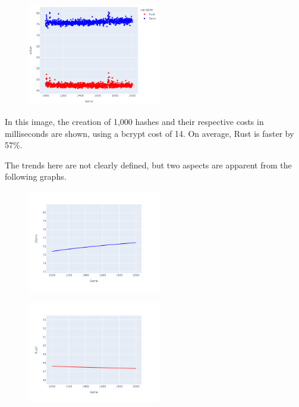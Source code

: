 \documentclass[12pt, letterpaper]{article}
\begin{document}
\begin{multicols}{2}
    \begin{figure}[H]
        \centering
        \includegraphics[width=0.52\textwidth]{hashing_lines}
    \end{figure}

    In this image, the creation of 1,000 hashes and their respective costs in milliseconds are shown, using a bcrypt cost of 14. On average, Rust is faster by 57\%.

    The trends here are not clearly defined, but two aspects are apparent from the following graphs.

    \begin{figure}[H]
        \centering
        \includegraphics[width=0.52\textwidth]{trend_hash_deno}
    \end{figure}

    \begin{figure}[H]
        \centering
        \includegraphics[width=0.52\textwidth]{images/trend_hash_rust.png}
    \end{figure}


\end{multicols}
\end{document}
